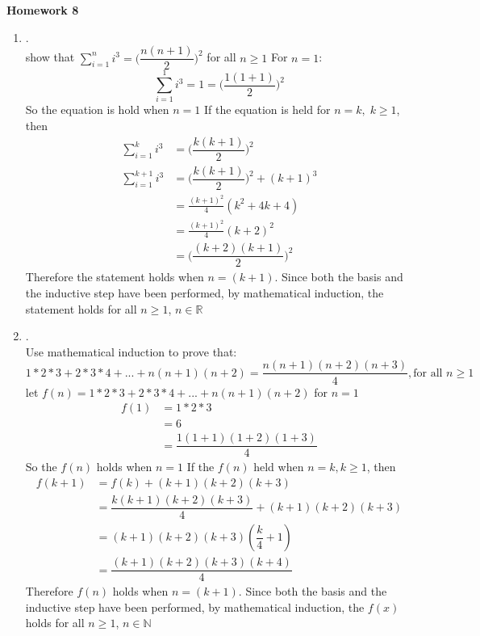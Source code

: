 \documentclass{article}
\theoremstyle{definition}
\theoremstyle{plain}
\begin{document}
\begin{center} \bf \LARGE Homework 8\\
\end{center}


\begin {enumerate}[itemindent=30pt,label=\bf Exercise {\arabic*}:]
\item .\\
show that $\sum \limits_{i=1}^{n} i^3 = \bigg(\dfrac{n(n+1)}{2} \bigg)^{2}$ for all $n \geq 1$
\subitem For $n = 1$:
	$$\sum \limits_{i=1}^{1} i^3 = 1 = \bigg(\dfrac{1(1+1)}{2}\bigg)^{2}$$
\subitem So the equation is hold when $n = 1$
\subitem If the equation is held for $n = k,\;k\geq 1$, then
\begin{align*}
	\sum \limits_{i=1}^{k} i^3 &= \bigg(\dfrac{k(k+1)}{2} \bigg)^{2} \\
	\sum \limits_{i=1}^{k+1} i^3 &= \bigg(\dfrac{k(k+1)}{2} \bigg)^{2} + (k+1)^3	\\
	& =\frac{(k+1)^2}{4}(k^2 + 4k + 4) \\
	& =\frac{(k+1)^2}{4}(k+2)^2\\
	&=\bigg(\dfrac{(k+2)(k+1)}{2} \bigg)^{2}
\end{align*}
\subitem Therefore the statement holds when $n=(k + 1)$.
\subitem Since both the basis and the inductive step have been performed, by mathematical induction, the statement holds for all $n \geq 1$, $n \in \mathbb{R}$
 \item .\\
 Use mathematical induction to prove that:
 $$1*2*3+2*3*4+...+n(n+1)(n+2) = \dfrac{n(n+1)(n+2)(n+3)}{4}, \text{for all } n \geq 1$$
\subitem let $f(n) = 1*2*3+2*3*4+...+n(n+1)(n+2)$
\subitem for $n = 1$
\begin{align*}
	f(1) &= 1*2*3 \\
		 &= 6 \\
		 &= \dfrac{1(1+1)(1+2)(1+3)}{4} 
\end{align*}
\subitem So the $f(n)$ holds when $n = 1$
\subitem If the $f(n)$ held when $n = k, k \geq 1$, then
\begin{align*}
	f(k+1) &= f(k) + (k+1)(k+2)(k+3)\\
		   &= \dfrac{k(k+1)(k+2)(k+3)}{4} + (k+1)(k+2)(k+3)\\
		   &= (k+1)(k+2)(k+3)(\dfrac{k}{4} + 1)\\
		   &= \dfrac{(k+1)(k+2)(k+3)(k+4)}{4}		   
\end{align*}
\subitem Therefore $f(n)$ holds when $n=(k + 1)$.
\subitem Since both the basis and the inductive step have been performed, by mathematical induction, the $f(x)$ holds for all $n \geq 1$, $n \in \mathbb{N}$

\end{enumerate}
\end{document}
